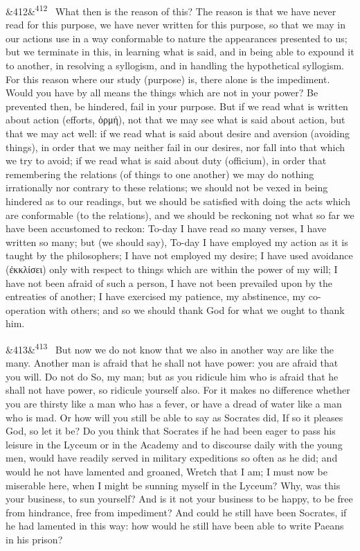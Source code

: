 \documentclass[12pt]{article}
\newcommand{\para}[1][]{\par\noindent\ifx&#1&\else\textsuperscript{\footnotesize #1}~\fi}
\begin{document}
\para[412] What then is the reason of this? The reason is that we have never read for this purpose, we have never written for this purpose, so that we may in our actions use in a way conformable to nature the appearances presented to us; but we terminate in this, in learning what is said, and in being able to expound it to another, in resolving a syllogism, and in handling the hypothetical syllogism. For this reason where our study (purpose) is, there alone is the impediment. Would you have by all means the things which are not in your power? Be prevented then, be hindered, fail in your purpose. But if we read what is written about action (efforts, ὁρμή), not that we may see what is said about action, but that we may act well: if we read what is said about desire and aversion (avoiding things), in order that we may neither fail in our desires, nor fall into that which we try to avoid; if we read what is said about duty (officium), in order that remembering the relations (of things to one another) we may do nothing irrationally nor contrary to these relations; we should not be vexed in being hindered as to our readings, but we should be satisfied with doing the acts which are conformable (to the relations), and we should be reckoning not what so far we have been accustomed to reckon: To-day I have read so many verses, I have written so many; but (we should say), To-day I have employed my action as it is taught by the philosophers; I have not employed my desire; I have used avoidance (ἐκκλίσει) only with respect to things which are within the power of my will; I have not been afraid of such a person, I have not been prevailed upon by the entreaties of another; I have exercised my patience, my abstinence, my co-operation with others; and so we should thank God for what we ought to thank him.

\para[413] But now we do not know that we also in another way are like the many. Another man is afraid that he shall not have power: you are afraid that you will. Do not do So, my man; but as you ridicule him who is afraid that he shall not have power, so ridicule yourself also. For it makes no difference whether you are thirsty like a man who has a fever, or have a dread of water like a man who is mad. Or how will you still be able to say as Socrates did, If so it pleases God, so let it be? Do you think that Socrates if he had been eager to pass his leisure in the Lyceum or in the Academy and to discourse daily with the young men, would have readily served in military expeditions so often as he did; and would he not have lamented and groaned, Wretch that I am; I must now be miserable here, when I might be sunning myself in the Lyceum? Why, was this your business, to sun yourself? And is it not your business to be happy, to be free from hindrance, free from impediment? And could he still have been Socrates, if he had lamented in this way: how would he still have been able to write Paeans in his prison?
\end{document}
